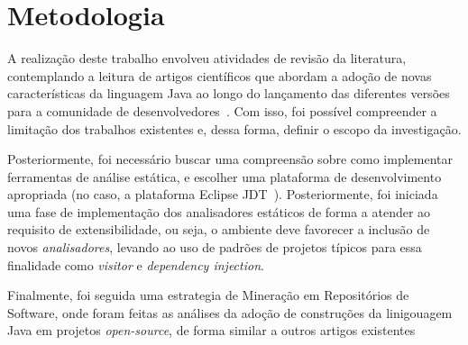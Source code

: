 %


\section{Metodologia}
    
    A realização deste trabalho envolveu atividades de revisão da literatura, contemplando a leitura 
    de artigos científicos que abordam a adoção de novas características da linguagem Java ao longo do 
    lançamento das diferentes versões para a comunidade de 
    desenvolvedores~\cite{Schaefer:ACM2009, Parnin:ACM2011,Overbey:2009,bonifacio:scam2015}. Com isso, foi 
    possível compreender a limitação dos trabalhos existentes e, dessa forma, definir o escopo da 
    investigação. 
    
    Posteriormente, foi necessário buscar uma compreensão sobre como implementar ferramentas de 
    análise estática, e escolher uma plataforma de desenvolvimento apropriada (no caso, a plataforma 
    Eclipse JDT~\cite{EclipseJDT}). Posteriormente, foi iniciada uma fase de implementação dos 
    analisadores estáticos de forma a atender ao requisito de extensibilidade, ou seja, o ambiente 
    deve favorecer a inclus\~{a}o de novos \emph{analisadores}, levando ao uso de 
    padrões de projetos típicos para essa finalidade como \textit{visitor} e \textit{dependency injection}.
    
     Finalmente, foi seguida uma estrategia de Mineração em Repositórios de Software, onde foram 
     feitas as análises da adoção de construções da linigouagem Java em projetos \textit{open-source}, de forma 
     similar a outros artigos existentes~\cite{pinto-jss:2015,Schaefer:ACM2009, Schaefer:ACM2010, Overbey:2009}
     
	
	
